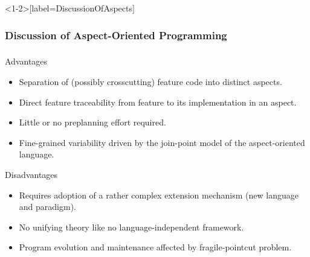 \begin{frame}<1-2>[label=DiscussionOfAspects]
	\frametitle<1-2>{Discussion of Aspect-Oriented Programming}
	\frametitle<3>{\myframetitle}
	\begin{mycolumns}
		\begin{note}{Advantages}
			\begin{itemize}
				\item Separation of (possibly crosscutting) feature code into distinct aspects.
				\item Direct feature traceability from feature to its implementation in an aspect.
				\item Little or no preplanning effort required.
				\item Fine-grained variability driven by the join-point model of the aspect-oriented language.
			\end{itemize}
		\end{note}
	\mynextcolumn
		\begin{note}{Disadvantages}
			\begin{itemize}
				\item Requires adoption of a rather complex extension mechanism (new language and paradigm).
				\item No unifying theory like no language-independent framework.
				\item Program evolution and maintenance affected by fragile-pointcut problem.
			\end{itemize}
		\end{note}
	\end{mycolumns}
\end{frame}